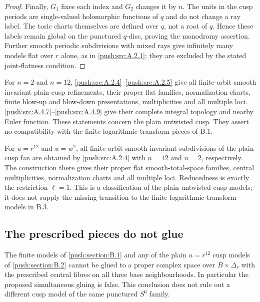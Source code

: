 \begin{proof}
Finally, $G_1$ fixes each index and $G_2$ changes it
by $n$. The units in the cusp periods are
single-valued holomorphic functions of $q$ and do
not change a ray label. The toric charts themselves
are defined over $q$, not a root of $q$. Hence
these labels remain global on the punctured
$q$-disc, proving the monodromy assertion. Further
smooth periodic subdivisions with mixed rays give
infinitely many models flat over $r$ alone, as in
\ref{push:src:A.2.1}; they are excluded by the stated joint-flatness
condition.
\end{proof}

\begin{corollary}\label{push:src:B.2.2}\label{push:B22}
For $n=2$ and $n=12$, \ref{push:src:A.2.4}--\ref{push:src:A.2.5} give all
finite-orbit smooth invariant plain-cusp refinements,
their proper flat families, normalization charts,
finite blow-up and blow-down presentations,
multiplicities and all multiple loci. \ref{push:src:A.4.7}--\ref{push:src:A.4.9}
give their complete integral topology and nearby
Euler function. These statements concern the plain
untwisted cusp. They assert no compatibility with
the finite logarithmic-transform pieces of B.1.
\end{corollary}


\begin{corollary}\label{push:src:B.2.3}\label{push:B23}
For $u=r^{12}$ and $u=w^2$, all finite-orbit smooth invariant
subdivisions of the plain cusp fan are obtained by \ref{push:src:A.2.4}
with $n=12$ and $n=2$, respectively. The construction there
gives their proper flat smooth-total-space families,
central multiplicities, normalization charts and all
multiple loci. Reducedness is exactly the restriction
$\ell=1$. This is a classification of the plain untwisted
cusp models; it does not supply the missing transition to
the finite logarithmic-transform models in B.3.
\end{corollary}


\subsection{The prescribed pieces do not glue}\label{push:section:B.3}

\begin{theorem}\label{push:src:B.3.1}\label{push:B31}
The finite models of \ref{push:section:B.1} and any of the plain
$u=r^{12}$ cusp models of \ref{push:section:B.2} cannot be glued to a
proper complex space over $B\times\Delta_r$ with
the prescribed central fibres on all three base
neighbourhoods. In particular the proposed simultaneous gluing is false. This conclusion does
not rule out a different cusp model of the same
punctured $S^6$ family.
\end{theorem}

